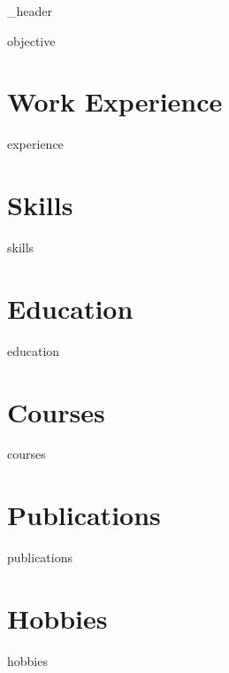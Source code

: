 \documentclass[letter,12pt]{article}
\author{\textcolor{\colorToUse}{Alberto 
 }\textcolor{blueSalling_secondary}{ 
 Gonz\'alez Olmos}} %
\def\colorToUse{blueSalling}
\begin{document}
{_header}

{objective}
\vspace*{7pt}





\section{\textcolor{\colorToUse}{Work Experience}}
\vspace*{5pt}
{experience}
\vspace*{7pt}

\section{\textcolor{\colorToUse}{Skills}}
\vspace*{5pt}
{skills}
\vspace*{7pt}

\section{\textcolor{\colorToUse}{Education}}
\vspace*{5pt}
{education}
\vspace*{7pt}

\section{\textcolor{\colorToUse}{Courses}}
\vspace*{5pt}
{courses}
\vspace*{7pt}

\section{\textcolor{\colorToUse}{Publications}}
\vspace*{5pt}
{publications}
\vspace*{7pt}

\section{\textcolor{\colorToUse}{Hobbies}}
{hobbies}
\end{document}
